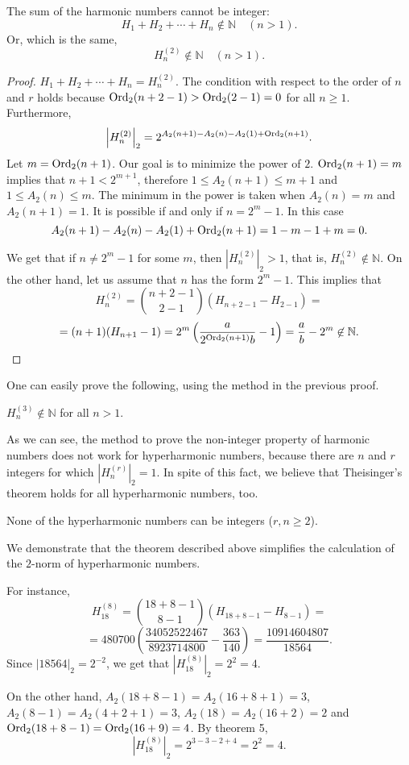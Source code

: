 \documentclass[a4paper,12pt]{amsart}
\begin{document}
\begin{Corollary}The sum of the harmonic numbers cannot be integer:
\[H_1+H_2+\cdots+H_n\not\in{\mathbb{N}}\quad(n>1).\]
Or, which is the same,
\[H_n^{(2)}\not\in{\mathbb{N}}\quad(n>1).\]
\end{Corollary}

\begin{proof}$H_1+H_2+\cdots+H_n=H_n^{(2)}$. The condition with respect to the order of $n$ and $r$ holds because ${\mathop{\textup{Ord}}\nolimits}_2(n+2-1)>{\mathop{\textup{Ord}}\nolimits}_2(2-1)=0$ for all $n\ge1$. Furthermore,
\[\left|H_n^{(2)}\right|_2=2^{A_2(n+1)-A_2(n)-A_2(1)+{\mathop{\textup{Ord}}\nolimits}_2(n+1)}.\]
Let $m={\mathop{\textup{Ord}}\nolimits}_2(n+1)$. Our goal is to minimize the power of $2$. ${\mathop{\textup{Ord}}\nolimits}_2(n+1)=m$ implies that $n+1<2^{m+1}$, therefore $1\le A_2(n+1)\le m+1$ and $1\le A_2(n)\le m$. The minimum in the power is taken when $A_2(n)=m$ and $A_2(n+1)=1$. It is possible if and only if $n=2^m-1$. In this case
\[A_2(n+1)-A_2(n)-A_2(1)+{\mathop{\textup{Ord}}\nolimits}_2(n+1)=1-m-1+m=0.\]

We get that if $n\neq 2^m-1$ for some $m$, then $|H_n^{(2)}|_2>1$, that is, $H_n^{(2)}\not\in{\mathbb{N}}$. On the other hand, let us assume that $n$ has the form $2^m-1$. This implies that
\[H_n^{(2)}=\binom{n+2-1}{2-1}(H_{n+2-1}-H_{2-1})=\]
\[=(n+1)(H_{n+1}-1)=2^m\left(\frac{a}{2^{{\mathop{\textup{Ord}}\nolimits}_2(n+1)}b}-1\right)=\frac{a}{b}-2^m\not\in{\mathbb{N}}.\]
\end{proof}

One can easily prove the following, using the method in the previous proof.

\begin{Corollary}$H_n^{(3)}\not\in{\mathbb{N}}$ for all $n>1$.
\end{Corollary}

As we can see, the method to prove the non-integer property of harmonic numbers does not work for hyperharmonic numbers, because there are $n$ and $r$ integers for which $|H_n^{(r)}|_2=1$. In spite of this fact, we believe that Theisinger's theorem holds for all hyperharmonic numbers, too.
\begin{Conjecture}
None of the hyperharmonic numbers can be integers ($r,n\ge 2$).
\end{Conjecture}

\begin{Example}We demonstrate that the theorem described above simplifies the calculation of the $2$-norm of hyperharmonic numbers.

For instance, 
\[H_{18}^{(8)}=\binom{18+8-1}{8-1}(H_{18+8-1}-H_{8-1})=\]
\[=480700\left(\frac{34052522467}{8923714800}-\frac{363}{140}\right)=\frac{10914604807}{18564}.\]
Since $|18564|_2=2^{-2}$, we get that $|H_{18}^{(8)}|_2=2^2=4$.

On the other hand, $A_2(18+8-1)=A_2(16+8+1)=3$, $A_2(8-1)=A_2(4+2+1)=3$, $A_2(18)=A_2(16+2)=2$ and ${\mathop{\textup{Ord}}\nolimits}_2(18+8-1)={\mathop{\textup{Ord}}\nolimits}_2(16+9)=4$. By theorem 5,
\[|H_{18}^{(8)}|_2=2^{3-3-2+4}=2^2=4.\]
\end{Example}
\end{document}
